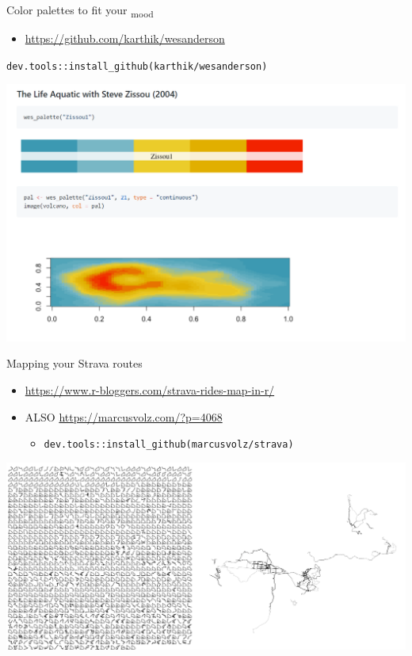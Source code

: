 \documentclass[ignorenonframetext,]{beamer}
\providecommand{\tightlist}{%
  \setlength{\itemsep}{0pt}\setlength{\parskip}{0pt}}
\begin{document}
\begin{frame}[fragile]{Color palettes to fit your \textsubscript{mood}}
\protect\hypertarget{color-palettes-to-fit-your-mood}{}

\begin{itemize}
\tightlist
\item
  \url{https://github.com/karthik/wesanderson}
\end{itemize}

\texttt{dev.tools::install\_github(karthik/wesanderson)}

\includegraphics{../external/images/funR_3_wes_anderson.png}

\end{frame}

\begin{frame}[fragile]{Mapping your Strava routes}
\protect\hypertarget{mapping-your-strava-routes}{}

\begin{itemize}
\tightlist
\item
  \url{https://www.r-bloggers.com/strava-rides-map-in-r/}
\item
  ALSO \url{https://marcusvolz.com/?p=4068}

  \begin{itemize}
  \tightlist
  \item
    \texttt{dev.tools::install\_github(marcusvolz/strava)}
  \end{itemize}
\end{itemize}

\includegraphics{../external/images/funR_4_strava_combo.png}

\end{frame}
\end{document}
